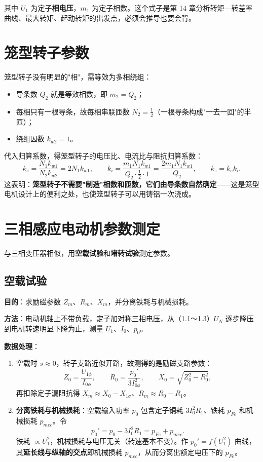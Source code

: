 
其中 $U_1$ 为定子\textbf{相电压}，$m_1$ 为定子相数。这个式子是第 14 章分析转矩—转差率曲线、最大转矩、起动转矩的出发点，必须会推导也要会背。

\section{笼型转子参数}

笼型转子没有明显的"相"，需等效为多相绕组：
\begin{itemize}
  \item 导条数 $Q_2$ 就是等效相数，即 $m_2=Q_2$；
  \item 每相只有一根导条，故每相串联匝数 $N_2=\tfrac12$（一根导条构成"一去一回"的半匝）；
  \item 绕组因数 $k_{w2}=1$。
\end{itemize}
代入归算系数，得笼型转子的电压比、电流比与阻抗归算系数：
\begin{equation}
k_e=\frac{N_1k_{w1}}{N_2k_{w2}}=2N_1k_{w1},\qquad
k_i=\frac{m_1N_1k_{w1}}{Q_2\cdot\frac12\cdot1}=\frac{2m_1N_1k_{w1}}{Q_2},\qquad
k_z=k_ek_i .
\end{equation}
这表明：\textbf{笼型转子不需要"制造"相数和匝数，它们由导条数自然确定}——这是笼型电机设计上的便利之处，也使笼型转子可以用铸铝一次浇成。

\section{三相感应电动机参数测定}

与三相变压器相似，用\textbf{空载试验}和\textbf{堵转试验}测定参数。

\subsection{空载试验}
\textbf{目的}：求励磁参数 $Z_m$、$R_m$、$X_m$，并分离铁耗与机械损耗。

\textbf{方法}：电动机轴上不带负载，定子加对称三相电压，从（1.1～1.3）$U_N$ 逐步降压到电机转速明显下降为止，测量 $U_1$、$I_0$、$p_0$。

\textbf{数据处理}：
\begin{enumerate}
  \item 空载时 $s\approx0$，转子支路近似开路，故测得的是励磁支路参数：
  \begin{equation}
  Z_0=\frac{U_{1\phi}}{I_{0\phi}},\qquad R_0=\frac{p_0'}{3I_{0\phi}^{2}},\qquad X_0=\sqrt{Z_0^{2}-R_0^{2}},
  \end{equation}
  再扣除定子漏阻抗得 $X_m\approx X_0-X_{1\sigma}$、$R_m\approx R_0-R_1$。
  \item \textbf{分离铁耗与机械损耗}：空载输入功率 $p_0$ 包含定子铜耗 $3I_0^2R_1$、铁耗 $p_{Fe}$ 和机械损耗 $p_{mec}$。令
  \begin{equation}
  p_0'=p_0-3I_0^{2}R_1=p_{Fe}+p_{mec} .
  \end{equation}
  铁耗 $\propto U_1^2$，机械损耗与电压无关（转速基本不变）。作 $p_0'=f(U_1^2)$ 曲线，其\textbf{延长线与纵轴的交点}即机械损耗 $p_{mec}$，从而分离出额定电压下的 $p_{Fe}$。
\end{enumerate}

